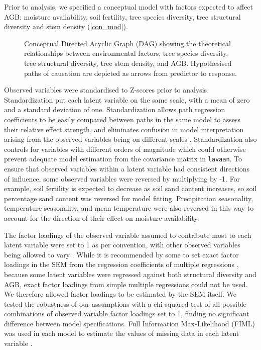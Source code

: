 \documentclass[11pt,a4paper]{article}
\begin{document}
Prior to analysis, we specified a conceptual model with factors expected to affect AGB: moisture availability, soil fertility, tree species diversity, tree structural diversity and stem density (\autoref{con_mod}). 

\begin{figure}[H]
\centering
	
	\caption{Conceptual Directed Acyclic Graph (DAG) showing the theoretical relationships between environmental factors, tree species diversity, tree structural diversity, tree stem density, and AGB. Hypothesised paths of causation are depicted as arrows from predictor to response.}
	\label{con_mod}
\end{figure}

Observed variables were standardised to Z-scores prior to analysis. Standardization put each latent variable on the same scale, with a mean of zero and a standard deviation of one. Standardization allows path regression coefficients to be easily compared between paths in the same model to assess their relative effect strength, and eliminates confusion in model interpretation arising from the observed variables being on different scales \citep{Beaujean2014}. Standardization also controls for variables with different orders of magnitude which could otherwise prevent adequate model estimation from the covariance matrix in \verb|lavaan|. To ensure that observed variables within a latent variable had consistent directions of influence, some observed variables were reversed by multiplying by -1. For example, soil fertility is expected to decrease as soil sand content increases, so soil percentage sand content was reversed for model fitting. Precipitation seasonality, temperature seasonality, and mean temperature were also reversed in this way to account for the direction of their effect on moisture availability.

The factor loadings of the observed variable assumed to contribute most to each latent variable were set to 1 as per convention, with other observed variables being allowed to vary \citep{Beaujean2014}. While it is recommended by some to set exact factor loadings in the SEM from the regression coefficients of multiple regressions \citep{lavaan}, because some latent variables were regressed against both structural diversity and AGB, exact factor loadings from simple multiple regressions could not be used. We therefore allowed factor loadings to be estimated by the SEM itself. We tested the robustness of our assumptions with a chi-squared test of all possible combinations of observed variable factor loadings set to 1, finding no significant difference between model specifications. Full Information Max-Likelihood (FIML) was used in each model to estimate the values of missing data in each latent variable \citep{Cham2017}.
\end{document}
